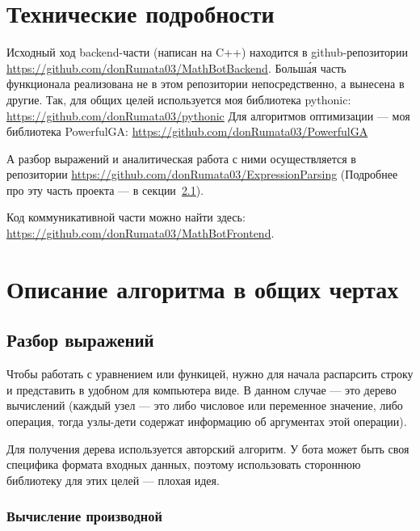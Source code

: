 \documentclass[11pt]{article}
\begin{document}
    \section{Технические подробности}

    Исходный ход backend-части (написан на C++) находится в github-репозитории \url{https://github.com/donRumata03/MathBotBackend}.
    Больша́я часть функционала реализована не в этом репозитории непосредственно, а вынесена в другие.
    Так, для общих целей используется моя библиотека pythonic: \url{https://github.com/donRumata03/pythonic}
    Для алгоритмов оптимизации — моя библиотека PowerfulGA: \url{https://github.com/donRumata03/PowerfulGA}

    А разбор выражений и аналитическая работа с ними осуществляется в репозитории \url{https://github.com/donRumata03/ExpressionParsing}
    (Подробнее про эту часть проекта — в секции~\ref{subsec:expression-parsing}).

    Код коммуникативной части можно найти здесь: \url{https://github.com/donRumata03/MathBotFrontend}.

    \section{Описание алгоритма в общих чертах}

    \subsection{Разбор выражений}\label{subsec:expression-parsing}
    Чтобы работать с уравнением или функицей, нужно для начала распарсить строку и представить в удобном для компьютера виде.
    В данном случае — это дерево вычислений (каждый узел — это либо числовое или переменное значение, либо операция, тогда узлы-дети содержат информацию об аргументах этой операции).

    Для получения дерева используется авторский алгоритм.
    У бота может быть своя специфика формата входных данных, поэтому использовать стороннюю библиотеку для этих целей — плохая идея.

    \subsubsection{Вычисление производной}
\end{document}
